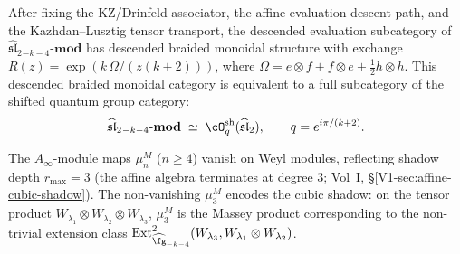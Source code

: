 \begin{proposition}
After fixing the KZ/Drinfeld associator, the affine evaluation
descent path, and the Kazhdan--Lusztig tensor transport, the descended
evaluation subcategory of
$\widehat{\mathfrak{sl}}_2{}_{-k-4}\text{-}\mathbf{mod}$
has descended braided monoidal structure with exchange
$R(z)=\exp(k\,\Omega/(z(k{+}2)))$, where
$\Omega=e\otimes f+f\otimes e+\tfrac12 h\otimes h$.
This descended braided monoidal category is equivalent to a
full subcategory of the shifted quantum group category:
\begin{equation}
\widehat{\mathfrak{sl}}_2{}_{-k-4}\text{-}\mathbf{mod}
\;\simeq\;
\cO^{\mathrm{sh}}_q(\widehat{\mathfrak{sl}}_2),
\qquad
q=e^{i\pi/(k+2)}.
\end{equation}

The $A_\infty$-module maps $\mu_n^M$ ($n\ge 4$) vanish
on Weyl modules, reflecting shadow depth $r_{\max}=3$
(the affine algebra terminates at degree $3$;
Vol~I, \S\ref*{V1-sec:affine-cubic-shadow}). The non-vanishing
$\mu_3^M$ encodes the cubic shadow: on the tensor product
$W_{\lambda_1}\otimes W_{\lambda_2}\otimes W_{\lambda_3}$,
$\mu_3^M$ is the Massey product corresponding to the
non-trivial extension class
$\operatorname{Ext}^2_{\widehat{\fg}_{-k-4}}
(W_{\lambda_3},W_{\lambda_1}\otimes W_{\lambda_2})$.
\end{proposition}

